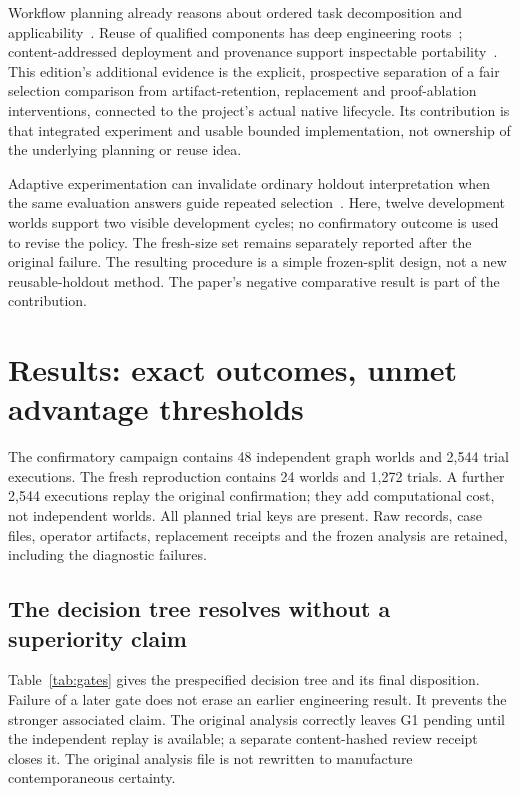 \documentclass[11pt,letterpaper]{article}
\begin{document}
Workflow planning already reasons about ordered task decomposition and applicability~\cite{nau2003shop2}. Reuse of qualified components has deep engineering roots~\cite{mcilroy1968components}; content-addressed deployment and provenance support inspectable portability~\cite{dolstra2004nix,chirigati2013reprozip}. This edition's additional evidence is the explicit, prospective separation of a fair selection comparison from artifact-retention, replacement and proof-ablation interventions, connected to the project's actual native lifecycle. Its contribution is that integrated experiment and usable bounded implementation, not ownership of the underlying planning or reuse idea.

Adaptive experimentation can invalidate ordinary holdout interpretation when the same evaluation answers guide repeated selection~\cite{dwork2015holdout}. Here, twelve development worlds support two visible development cycles; no confirmatory outcome is used to revise the policy. The fresh-size set remains separately reported after the original failure. The resulting procedure is a simple frozen-split design, not a new reusable-holdout method. The paper's negative comparative result is part of the contribution.

\FloatBarrier
\section{Results: exact outcomes, unmet advantage thresholds}
\label{sec:results}
The confirmatory campaign contains 48 independent graph worlds and 2,544 trial executions. The fresh reproduction contains 24 worlds and 1,272 trials. A further 2,544 executions replay the original confirmation; they add computational cost, not independent worlds. All planned trial keys are present. Raw records, case files, operator artifacts, replacement receipts and the frozen analysis are retained, including the diagnostic failures.

\subsection{The decision tree resolves without a superiority claim}
Table~\ref{tab:gates} gives the prespecified decision tree and its final disposition. Failure of a later gate does not erase an earlier engineering result. It prevents the stronger associated claim. The original analysis correctly leaves G1 pending until the independent replay is available; a separate content-hashed review receipt closes it. The original analysis file is not rewritten to manufacture contemporaneous certainty.
\end{document}
